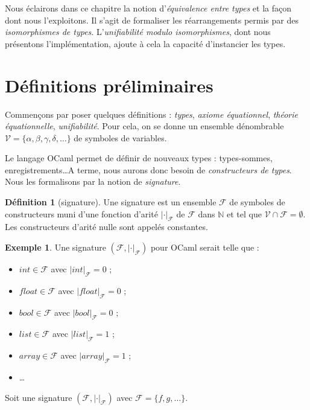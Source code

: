 \documentclass[a4paper]{report}
\theoremstyle{definition}
\newtheorem{definition}[theoreme]{Définition}
\newtheorem{exemple}[theoreme]{Exemple}
\newcommand{\V}{\mathscr V}
\newcommand{\F}{\mathscr F}
\begin{document}
Nous éclairons dans ce chapitre la notion d'\emph{équivalence entre types} et la façon dont nous l'exploitons. Il s'agit de formaliser les réarrangements permis par des \emph{isomorphismes de types}. L'\emph{unifiabilité modulo isomorphismes}, dont nous présentons l'implémentation, ajoute à cela la capacité d'instancier les types.


\section{Définitions préliminaires}

Commençons par poser quelques définitions : \emph{types}, \emph{axiome équationnel}, \emph{théorie équationnelle}, \emph{unifiabilité}. Pour cela, on se donne un ensemble dénombrable $\V = \{ \alpha, \beta, \gamma, \delta, \dots \}$ de symboles de variables.

Le langage OCaml permet de définir de nouveaux types : types-sommes, enregistrements\dots A terme, nous aurons donc besoin de \emph{constructeurs de types}. Nous les formalisons par la notion de \emph{signature}.

\begin{definition}[signature]
	Une signature est un ensemble $\F$ de symboles de constructeurs muni d'une fonction d'arité $| \cdot |_\F$ de $\F$ dans $\mathbb N$ et tel que $\V \cap \F = \emptyset$. Les constructeurs d'arité nulle sont appelés constantes.
\end{definition}

\begin{exemple}
	Une signature $( \F, | \cdot |_\F )$ pour OCaml serait telle que :
	\begin{itemize}
		\item $int \in \F$ avec $| int |_\F = 0$ ;
		\item $float \in \F$ avec $| float |_\F = 0$ ;
		\item $bool \in \F$ avec $| bool |_\F = 0$ ;
		\item $list \in \F$ avec $| list |_\F = 1$ ;
		\item $array \in \F$ avec $| array |_\F = 1$ ;
		\item \dots
	\end{itemize}
\end{exemple}

Soit une signature $( \F, | \cdot |_\F )$ avec $\F = \{ f, g, \dots \}$.
\end{document}
